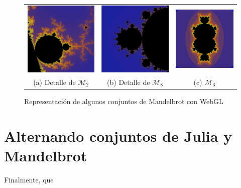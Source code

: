 \begin{figure}[ht]
    \centering
    \begin{tabular}{ccc}
      \includegraphics[scale=0.23]{img/C7/mandelbrot-1.png} &   \includegraphics[scale=0.23]{img/C7/mandelbrot-2.png} &   \includegraphics[scale=0.23]{img/C7/mandelbrot-3.png} \\
    (a) Detalle de $\mathcal{M}_2$ & (b) Detalle de $\mathcal{M}_8$ & (c) $\mathcal{M}_3$ \\[6pt]
    \end{tabular}
    \caption{Representación de algunos conjuntos de Mandelbrot con WebGL}
    \label{fig:mandelbrot-webgl}
\end{figure}

\newpage

\section{Alternando conjuntos de Julia y Mandelbrot}
\label{section:alternando}

Finalmente, que